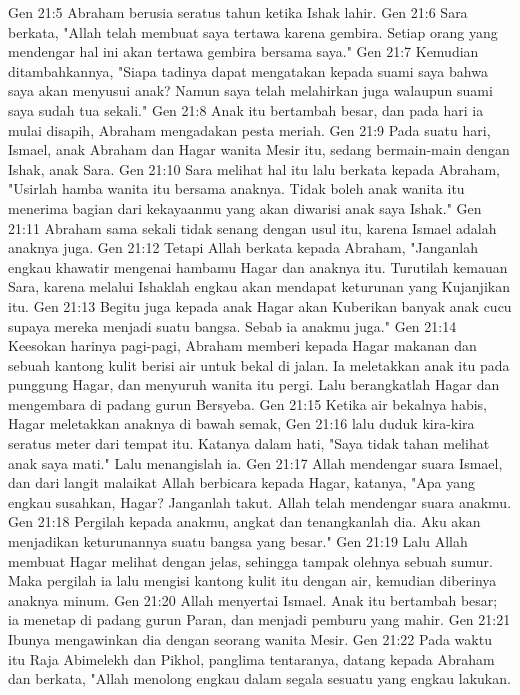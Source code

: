Gen 21:5  Abraham berusia seratus tahun ketika Ishak lahir.
Gen 21:6  Sara berkata, "Allah telah membuat saya tertawa karena gembira. Setiap orang yang mendengar hal ini akan tertawa gembira bersama saya."
Gen 21:7  Kemudian ditambahkannya, "Siapa tadinya dapat mengatakan kepada suami saya bahwa saya akan menyusui anak? Namun saya telah melahirkan juga walaupun suami saya sudah tua sekali."
Gen 21:8  Anak itu bertambah besar, dan pada hari ia mulai disapih, Abraham mengadakan pesta meriah.
Gen 21:9  Pada suatu hari, Ismael, anak Abraham dan Hagar wanita Mesir itu, sedang bermain-main dengan Ishak, anak Sara.
Gen 21:10  Sara melihat hal itu lalu berkata kepada Abraham, "Usirlah hamba wanita itu bersama anaknya. Tidak boleh anak wanita itu menerima bagian dari kekayaanmu yang akan diwarisi anak saya Ishak."
Gen 21:11  Abraham sama sekali tidak senang dengan usul itu, karena Ismael adalah anaknya juga.
Gen 21:12  Tetapi Allah berkata kepada Abraham, "Janganlah engkau khawatir mengenai hambamu Hagar dan anaknya itu. Turutilah kemauan Sara, karena melalui Ishaklah engkau akan mendapat keturunan yang Kujanjikan itu.
Gen 21:13  Begitu juga kepada anak Hagar akan Kuberikan banyak anak cucu supaya mereka menjadi suatu bangsa. Sebab ia anakmu juga."
Gen 21:14  Keesokan harinya pagi-pagi, Abraham memberi kepada Hagar makanan dan sebuah kantong kulit berisi air untuk bekal di jalan. Ia meletakkan anak itu pada punggung Hagar, dan menyuruh wanita itu pergi. Lalu berangkatlah Hagar dan mengembara di padang gurun Bersyeba.
Gen 21:15  Ketika air bekalnya habis, Hagar meletakkan anaknya di bawah semak,
Gen 21:16  lalu duduk kira-kira seratus meter dari tempat itu. Katanya dalam hati, "Saya tidak tahan melihat anak saya mati." Lalu menangislah ia.
Gen 21:17  Allah mendengar suara Ismael, dan dari langit malaikat Allah berbicara kepada Hagar, katanya, "Apa yang engkau susahkan, Hagar? Janganlah takut. Allah telah mendengar suara anakmu.
Gen 21:18  Pergilah kepada anakmu, angkat dan tenangkanlah dia. Aku akan menjadikan keturunannya suatu bangsa yang besar."
Gen 21:19  Lalu Allah membuat Hagar melihat dengan jelas, sehingga tampak olehnya sebuah sumur. Maka pergilah ia lalu mengisi kantong kulit itu dengan air, kemudian diberinya anaknya minum.
Gen 21:20  Allah menyertai Ismael. Anak itu bertambah besar; ia menetap di padang gurun Paran, dan menjadi pemburu yang mahir.
Gen 21:21  Ibunya mengawinkan dia dengan seorang wanita Mesir.
Gen 21:22  Pada waktu itu Raja Abimelekh dan Pikhol, panglima tentaranya, datang kepada Abraham dan berkata, "Allah menolong engkau dalam segala sesuatu yang engkau lakukan.
